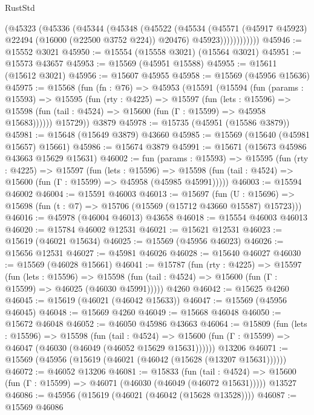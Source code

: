 \begin{lexlean}{RustStd}
\begin{coremodule}
                (@45323
                  (@45336
                    (@45344
                      (@45348
                        (@45522
                          (@45534
                            (@45571 (@45917 @45923) @22494 (@16000 (@22500 @3752 @224)) @20476)
                            @45923))))))))))))
@45946 := @15552 @3021
@45950 := @15554 (@15558 @3021) (@15564 @3021)
@45951 := @15573 @43657
@45953 := @15569 (@45951 @15588)
@45955 := @15611 (@15612 @3021)
@45956 := @15607 @45955
@45958 := @15569 (@45956 @15636)
@45975 := @15568
    (fun (fn : @76) =>
    @45953
      (@15591
        (@15594
          (fun (params : @15593) =>
          @15595
            (fun (rty : @4225) =>
            @15597
              (fun (lets : @15596) =>
              @15598 (fun (tail : @4524) => @15600 (fun (Γ : @15599) => @45958 @15683))))))
        @15729))
    @3879
@45978 := @15735 (@45951 (@15586 @3879))
@45981 := @15648 (@15649 @3879) @43660
@45985 := @15569 (@15640 (@45981 @15657) @15661)
@45986 := @15674 @3879
@45991 := @15671 (@15673 @45986 @43663 @15629 @15631)
@46002 := fun (params : @15593) =>
  @15595
    (fun (rty : @4225) =>
    @15597
      (fun (lets : @15596) =>
      @15598 (fun (tail : @4524) => @15600 (fun (Γ : @15599) => @45958 (@45985 @45991)))))
@46003 := @15594 @46002
@46004 := @15591 @46003
@46013 := @15697
    (fun (U : @15696) => @15698 (fun (t : @7) => @15706 (@15569 (@15712 @43660 @15587) @15723)))
@46016 := @45978 (@46004 @46013) @43658
@46018 := @15554 @46003 @46013
@46020 := @15784 @46002 @12531
@46021 := @15621 @12531
@46023 := @15619 (@46021 @15634)
@46025 := @15569 (@45956 @46023)
@46026 := @15656 @12531
@46027 := @45981 @46026
@46028 := @15640 @46027
@46030 := @15569 (@46028 @15661)
@46041 := @15787
    (fun (rty : @4225) =>
    @15597
      (fun (lets : @15596) =>
      @15598 (fun (tail : @4524) => @15600 (fun (Γ : @15599) => @46025 (@46030 @45991)))))
    @4260
@46042 := @15625 @4260
@46045 := @15619 (@46021 (@46042 @15633))
@46047 := @15569 (@45956 @46045)
@46048 := @15669 @4260
@46049 := @15668 @46048
@46050 := @15672 @46048
@46052 := @46050 @45986 @43663
@46064 := @15809
    (fun (lets : @15596) =>
    @15598
      (fun (tail : @4524) =>
      @15600 (fun (Γ : @15599) => @46047 (@46030 (@46049 (@46052 @15629 @15631))))))
    @13206
@46071 := @15569 (@45956 (@15619 (@46021 (@46042 (@15628 (@13207 @15631))))))
@46072 := @46052 @13206
@46081 := @15833
    (fun (tail : @4524) => @15600 (fun (Γ : @15599) => @46071 (@46030 (@46049 (@46072 @15631)))))
    @13527
@46086 := @45956 (@15619 (@46021 (@46042 (@15628 @13528))))
@46087 := @15569 @46086

\end{coremodule}
\end{lexlean}
